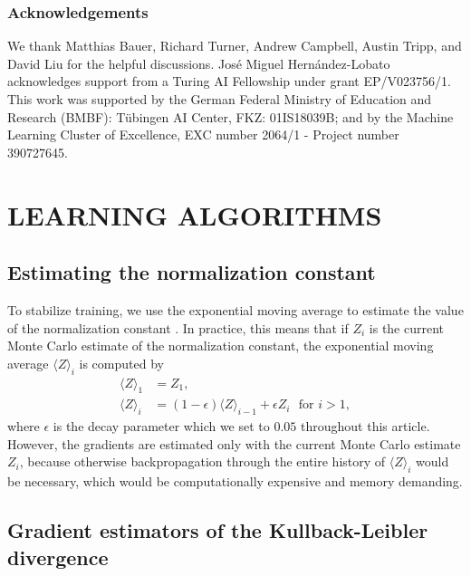 \documentclass[twoside]{article}
\begin{document}
\subsubsection*{Acknowledgements}
We thank Matthias Bauer, Richard Turner, Andrew Campbell, Austin Tripp, and David Liu for the helpful discussions.
Jos\'e Miguel Hern\'andez-Lobato acknowledges support from a Turing AI Fellowship under grant EP/V023756/1.
This work was supported by the German Federal Ministry of Education and Research (BMBF): Tübingen AI Center, FKZ: 01IS18039B; and by the Machine Learning Cluster of Excellence, EXC number 2064/1 - Project number 390727645. 








\clearpage
\appendix

\thispagestyle{empty}


\onecolumn \makesupplementtitle



\section{LEARNING ALGORITHMS}
\label{sec:a_learn_alg}

\subsection{Estimating the normalization constant}
\label{sec:ml_learn}

To stabilize training, we use the exponential moving average to estimate the value of the normalization constant \citep{Bauer2019}. In practice, this means that if $Z_i$ is the current Monte Carlo estimate of the normalization constant, the exponential moving average $\langle Z \rangle_i$ is computed by
\begin{align}
	\langle Z \rangle_1 &= Z_1, \\
	\langle Z \rangle_i &= (1 - \epsilon)\langle Z \rangle_{i-1} + \epsilon Z_i \,\,\text{    for } i>1,
\end{align}
where $\epsilon$ is the decay parameter which we set to $0.05$ throughout this article. However, the gradients are estimated only with the current Monte Carlo estimate $Z_i$, because otherwise backpropagation through the entire history of $\langle Z \rangle_i$ would be necessary, which would be computationally expensive and memory demanding.


\subsection{Gradient estimators of the Kullback-Leibler divergence}
\label{sec:rkld_proof}
\end{document}
